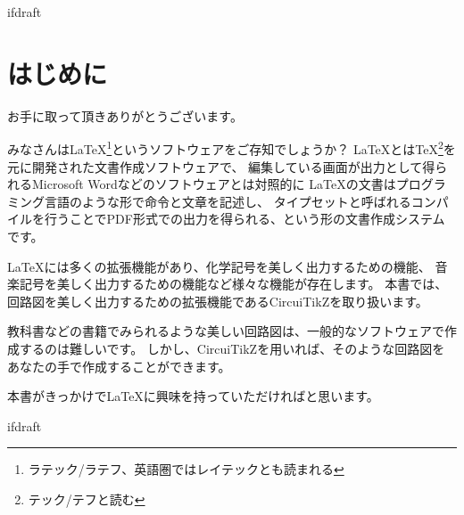 \expandafter\ifx\csname ifdraft\endcsname\relax
    
	
\fi

\chapter{はじめに}
	お手に取って頂きありがとうございます。

	みなさんは\LaTeX \footnote{ラテック/ラテフ、英語圏ではレイテックとも読まれる}というソフトウェアをご存知でしょうか？
	\LaTeX とは\TeX \footnote{テック/テフと読む}を元に開発された文書作成ソフトウェアで、
	編集している画面が出力として得られるMicrosoft Wordなどのソフトウェアとは対照的に
	\LaTeX の文書はプログラミング言語のような形で命令と文章を記述し、
	タイプセットと呼ばれるコンパイルを行うことでPDF形式での出力を得られる、という形の文書作成システムです。

	\LaTeX には多くの拡張機能があり、化学記号を美しく出力するための機能、
	音楽記号を美しく出力するための機能など様々な機能が存在します。
	本書では、回路図を美しく出力するための拡張機能であるCircuiTikZを取り扱います。

	教科書などの書籍でみられるような美しい回路図は、一般的なソフトウェアで作成するのは難しいです。
	しかし、CircuiTikZを用いれば、そのような回路図をあなたの手で作成することができます。

	本書がきっかけで\LaTeX に興味を持っていただければと思います。

\expandafter\ifx\csname ifdraft\endcsname\relax
	
\fi
